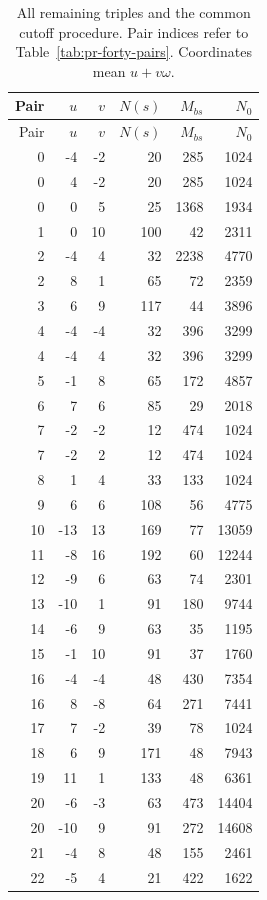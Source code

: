 \documentclass[12pt]{article}
\numberwithin{equation}{section}
\begin{document}
\begin{longtable}{r|r r|r|r|r}
\caption{All remaining triples and the common cutoff procedure. Pair indices refer to Table~\ref{tab:pr-forty-pairs}. Coordinates mean $u+v\omega$.}\label{tab:fixed56}\\
Pair&$u$&$v$&$N(s)$&$M_{bs}$&$N_0$\\\hline
\endfirsthead
Pair&$u$&$v$&$N(s)$&$M_{bs}$&$N_0$\\\hline
\endhead
0 & -4 & -2 & 20 & 285 & 1024 \\
0 & 4 & -2 & 20 & 285 & 1024 \\
0 & 0 & 5 & 25 & 1368 & 1934 \\
1 & 0 & 10 & 100 & 42 & 2311 \\
2 & -4 & 4 & 32 & 2238 & 4770 \\
2 & 8 & 1 & 65 & 72 & 2359 \\
3 & 6 & 9 & 117 & 44 & 3896 \\
4 & -4 & -4 & 32 & 396 & 3299 \\
4 & -4 & 4 & 32 & 396 & 3299 \\
5 & -1 & 8 & 65 & 172 & 4857 \\
6 & 7 & 6 & 85 & 29 & 2018 \\
7 & -2 & -2 & 12 & 474 & 1024 \\
7 & -2 & 2 & 12 & 474 & 1024 \\
8 & 1 & 4 & 33 & 133 & 1024 \\
9 & 6 & 6 & 108 & 56 & 4775 \\
10 & -13 & 13 & 169 & 77 & 13059 \\
11 & -8 & 16 & 192 & 60 & 12244 \\
12 & -9 & 6 & 63 & 74 & 2301 \\
13 & -10 & 1 & 91 & 180 & 9744 \\
14 & -6 & 9 & 63 & 35 & 1195 \\
15 & -1 & 10 & 91 & 37 & 1760 \\
16 & -4 & -4 & 48 & 430 & 7354 \\
16 & 8 & -8 & 64 & 271 & 7441 \\
17 & 7 & -2 & 39 & 78 & 1024 \\
18 & 6 & 9 & 171 & 48 & 7943 \\
19 & 11 & 1 & 133 & 48 & 6361 \\
20 & -6 & -3 & 63 & 473 & 14404 \\
20 & -10 & 9 & 91 & 272 & 14608 \\
21 & -4 & 8 & 48 & 155 & 2461 \\
22 & -5 & 4 & 21 & 422 & 1622 \\

\end{longtable}
\end{document}
